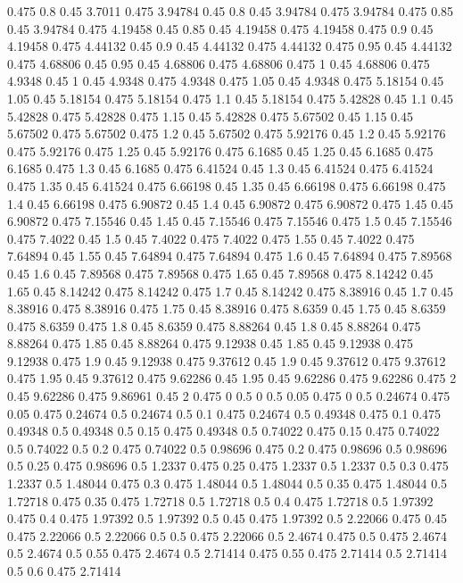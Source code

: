 0.475 0.8
0.45 3.7011
0.475 3.94784
0.45 0.8
0.45 3.94784
0.475 3.94784
0.475 0.85
0.45 3.94784
0.475 4.19458
0.45 0.85
0.45 4.19458
0.475 4.19458
0.475 0.9
0.45 4.19458
0.475 4.44132
0.45 0.9
0.45 4.44132
0.475 4.44132
0.475 0.95
0.45 4.44132
0.475 4.68806
0.45 0.95
0.45 4.68806
0.475 4.68806
0.475 1
0.45 4.68806
0.475 4.9348
0.45 1
0.45 4.9348
0.475 4.9348
0.475 1.05
0.45 4.9348
0.475 5.18154
0.45 1.05
0.45 5.18154
0.475 5.18154
0.475 1.1
0.45 5.18154
0.475 5.42828
0.45 1.1
0.45 5.42828
0.475 5.42828
0.475 1.15
0.45 5.42828
0.475 5.67502
0.45 1.15
0.45 5.67502
0.475 5.67502
0.475 1.2
0.45 5.67502
0.475 5.92176
0.45 1.2
0.45 5.92176
0.475 5.92176
0.475 1.25
0.45 5.92176
0.475 6.1685
0.45 1.25
0.45 6.1685
0.475 6.1685
0.475 1.3
0.45 6.1685
0.475 6.41524
0.45 1.3
0.45 6.41524
0.475 6.41524
0.475 1.35
0.45 6.41524
0.475 6.66198
0.45 1.35
0.45 6.66198
0.475 6.66198
0.475 1.4
0.45 6.66198
0.475 6.90872
0.45 1.4
0.45 6.90872
0.475 6.90872
0.475 1.45
0.45 6.90872
0.475 7.15546
0.45 1.45
0.45 7.15546
0.475 7.15546
0.475 1.5
0.45 7.15546
0.475 7.4022
0.45 1.5
0.45 7.4022
0.475 7.4022
0.475 1.55
0.45 7.4022
0.475 7.64894
0.45 1.55
0.45 7.64894
0.475 7.64894
0.475 1.6
0.45 7.64894
0.475 7.89568
0.45 1.6
0.45 7.89568
0.475 7.89568
0.475 1.65
0.45 7.89568
0.475 8.14242
0.45 1.65
0.45 8.14242
0.475 8.14242
0.475 1.7
0.45 8.14242
0.475 8.38916
0.45 1.7
0.45 8.38916
0.475 8.38916
0.475 1.75
0.45 8.38916
0.475 8.6359
0.45 1.75
0.45 8.6359
0.475 8.6359
0.475 1.8
0.45 8.6359
0.475 8.88264
0.45 1.8
0.45 8.88264
0.475 8.88264
0.475 1.85
0.45 8.88264
0.475 9.12938
0.45 1.85
0.45 9.12938
0.475 9.12938
0.475 1.9
0.45 9.12938
0.475 9.37612
0.45 1.9
0.45 9.37612
0.475 9.37612
0.475 1.95
0.45 9.37612
0.475 9.62286
0.45 1.95
0.45 9.62286
0.475 9.62286
0.475 2
0.45 9.62286
0.475 9.86961
0.45 2
0.475 0
0.5 0
0.5 0.05
0.475 0
0.5 0.24674
0.475 0.05
0.475 0.24674
0.5 0.24674
0.5 0.1
0.475 0.24674
0.5 0.49348
0.475 0.1
0.475 0.49348
0.5 0.49348
0.5 0.15
0.475 0.49348
0.5 0.74022
0.475 0.15
0.475 0.74022
0.5 0.74022
0.5 0.2
0.475 0.74022
0.5 0.98696
0.475 0.2
0.475 0.98696
0.5 0.98696
0.5 0.25
0.475 0.98696
0.5 1.2337
0.475 0.25
0.475 1.2337
0.5 1.2337
0.5 0.3
0.475 1.2337
0.5 1.48044
0.475 0.3
0.475 1.48044
0.5 1.48044
0.5 0.35
0.475 1.48044
0.5 1.72718
0.475 0.35
0.475 1.72718
0.5 1.72718
0.5 0.4
0.475 1.72718
0.5 1.97392
0.475 0.4
0.475 1.97392
0.5 1.97392
0.5 0.45
0.475 1.97392
0.5 2.22066
0.475 0.45
0.475 2.22066
0.5 2.22066
0.5 0.5
0.475 2.22066
0.5 2.4674
0.475 0.5
0.475 2.4674
0.5 2.4674
0.5 0.55
0.475 2.4674
0.5 2.71414
0.475 0.55
0.475 2.71414
0.5 2.71414
0.5 0.6
0.475 2.71414
